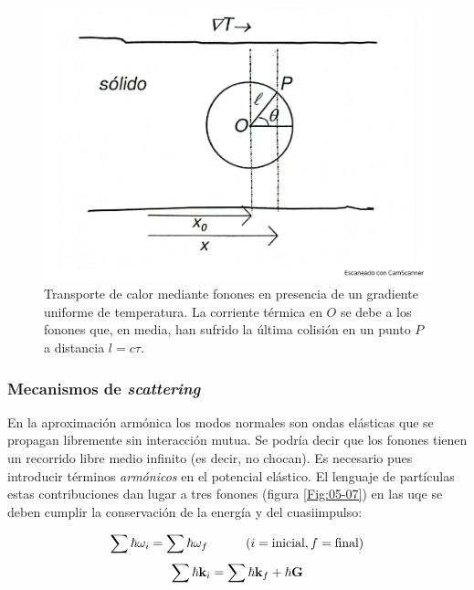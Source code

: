 \begin{figure}[h!] \centering
    \includegraphics[scale=0.25]{Cuerpo/Ch_05/Fotos libro 6.pdf}
    \caption{Transporte de calor mediante fonones en presencia de un gradiente uniforme de temperatura. La corriente térmica en $O$ se debe a los fonones que, en media, han sufrido la última colisión en un punto $P$ a distancia $l=c\tau$.}
    \label{Fig:05-06}
\end{figure}    
 
\subsubsection{Mecanismos de \textit{scattering}}

En la aproximación armónica los modos normales son ondas elásticas que se propagan libremente sin interacción mutua. Se podría decir que los fonones tienen un recorrido libre medio infinito (es decir, no chocan). Es necesario pues introducir términos \textit{armónicos} en el potencial elástico. El lenguaje de partículas estas contribuciones dan lugar a tres fonones (figura \ref{Fig:05-07}) en las uqe se deben cumplir la conservación de la energía y del cuasiimpulso:

\begin{equation*}
    \sum \hbar \omega_i = \sum \hbar \omega_f  \quad \quad \quad (i=\text{inicial}, f= \text{final})
\end{equation*}
\begin{equation}
    \sum \hbar \mathbf{k}_i = \sum \hbar \mathbf{k}_f + \hbar \mathbf{G}
\end{equation}

